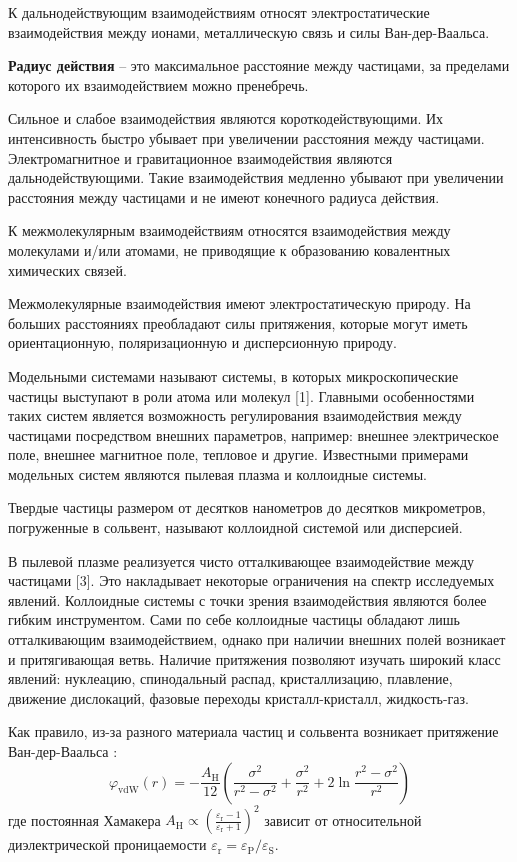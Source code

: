 К дальнодействующим взаимодействиям относят электростатические взаимодействия между ионами, металлическую связь и силы Ван-дер-Ваальса. 

\textbf{Радиус действия} – это максимальное расстояние между частицами, за пределами которого их взаимодействием можно пренебречь.

Сильное и слабое взаимодействия являются короткодействующими. Их интенсивность быстро убывает при увеличении расстояния между частицами.  Электромагнитное и гравитационное взаимодействия являются дальнодействующими. Такие взаимодействия медленно убывают при увеличении расстояния между частицами и не имеют конечного радиуса действия.

К межмолекулярным взаимодействиям относятся взаимодействия между молекулами и/или атомами, не приводящие к образованию ковалентных химических связей.

Межмолекулярные взаимодействия имеют электростатическую природу. На больших расстояниях преобладают силы притяжения, которые могут иметь ориентационную, поляризационную и дисперсионную природу.

Модельными системами называют системы, в которых микроскопические частицы выступают в роли атома или молекул [1]. Главными особенностями таких систем является возможность регулирования взаимодействия между частицами посредством внешних параметров, например: внешнее электрическое поле, внешнее магнитное поле, тепловое и другие. Известными примерами модельных систем являются пылевая плазма и коллоидные системы. 

Твердые частицы размером от десятков нанометров до десятков микрометров, погруженные в сольвент, называют коллоидной системой или дисперсией.

В пылевой плазме реализуется чисто отталкивающее взаимодействие между частицами [3]. Это накладывает некоторые ограничения на спектр исследуемых явлений. Коллоидные системы с точки зрения взаимодействия являются более гибким инструментом. Сами по себе коллоидные частицы обладают лишь отталкивающим взаимодействием, однако при наличии внешних полей возникает и притягивающая ветвь. Наличие притяжения позволяют изучать широкий класс явлений: нуклеацию, спинодальный распад, кристаллизацию, плавление, движение дислокаций, фазовые переходы кристалл-кристалл, жидкость-газ.

Как правило, из-за разного материала частиц и сольвента возникает притяжение Ван-дер-Ваальса \cite{Yur31, Yur53}:
\begin{equation}
\varphi_{\mathrm{vdW}}(r)=-\frac{A_{\mathrm{H}}}{12}\left(\frac{\sigma^{2}}{r^{2}-\sigma^{2}}+\frac{\sigma^{2}}{r^{2}}+2 \ln \frac{r^{2}-\sigma^{2}}{r^{2}}\right)
\end{equation}
где постоянная Хамакера $A_{\mathrm{H}} \propto\left(\frac{\varepsilon_{\mathrm{r}}-1}{\varepsilon_{\mathrm{r}}+1}\right)^{2}$ зависит от относительной диэлектрической проницаемости $\varepsilon_{\mathrm{r}}=\varepsilon_{\mathrm{P}} / \varepsilon_{\mathrm{S}}$. 

